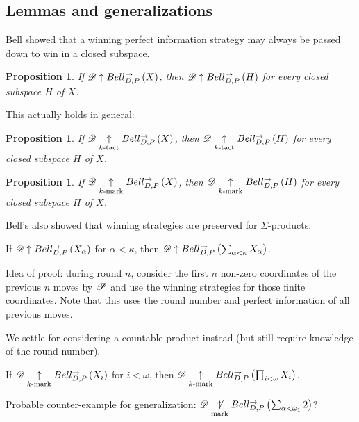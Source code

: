 \documentclass{beamer}
\newtheorem{proposition}[theorem]{Proposition}
\theoremstyle{definition}
\begin{document}
\subsection{Lemmas and generalizations}

\begin{frame}\small
  Bell showed that a winning perfect information strategy may always
  be passed down to win in a closed subspace.

  \begin{proposition}
    If $\mathscr{D}\uparrow Bell_{D,P}^{\to}\left({X}\right)$, then
    $\mathscr{D}\uparrow Bell_{D,P}^{\to}\left({H}\right)$ for every closed subspace $H$ of $X$.
  \end{proposition}

  \pause

  This actually holds in general:

  \begin{proposition}
    If $\mathscr{D}\underset{k\text{-tact}}{\uparrow}Bell_{D,P}^{\to}\left({X}\right)$, then
    $\mathscr{D}\underset{k\text{-tact}}{\uparrow}Bell_{D,P}^{\to}\left({H}\right)$ for every closed subspace $H$ of $X$.
  \end{proposition}

  \begin{proposition}
    If $\mathscr{D}\underset{k\text{-mark}}{\uparrow}Bell_{D,P}^{\to}\left({X}\right)$, then
    $\mathscr{D}\underset{k\text{-mark}}{\uparrow}Bell_{D,P}^{\to}\left({H}\right)$ for every closed subspace $H$ of $X$.
  \end{proposition}
\end{frame}

\begin{frame}
  Bell's also showed that winning strategies
  are preserved for $\Sigma$-products.

  \begin{theorem}
    If $\mathscr{D}\uparrow Bell_{D,P}^{\to}\left({X_\alpha}\right)$ for $\alpha<\kappa$, then
    $\mathscr{D}\uparrow Bell_{D,P}^{\to}\left({\sum_{\alpha<\kappa}X_\alpha}\right)$.
  \end{theorem}

  \vpause

  Idea of proof: during round $n$, consider the first $n$ non-zero coordinates
  of the previous $n$ moves by $\mathscr{P}$ and use the winning strategies for
  those finite coordinates. Note that this uses the round number
  and perfect information of all previous moves.

\end{frame}

\begin{frame}
  We settle for considering a countable product instead (but still require
  knowledge of the round number).

  \begin{theorem}
    If $\mathscr{D}\underset{k\text{-mark}}{\uparrow}Bell_{D,P}^{\to}\left({X_i}\right)$ for $i<\omega$,
    then $\mathscr{D}\underset{k\text{-mark}}{\uparrow}Bell_{D,P}^{\to}\left({\prod_{i<\omega} X_i}\right)$.
  \end{theorem}

  Probable counter-example for generalization:
  $\mathscr{D}\underset{\text{mark}}{\not\uparrow}Bell_{D,P}^{\to}\left({\sum_{\alpha<\omega_1} 2}\right)$?
\end{frame}
\end{document}
